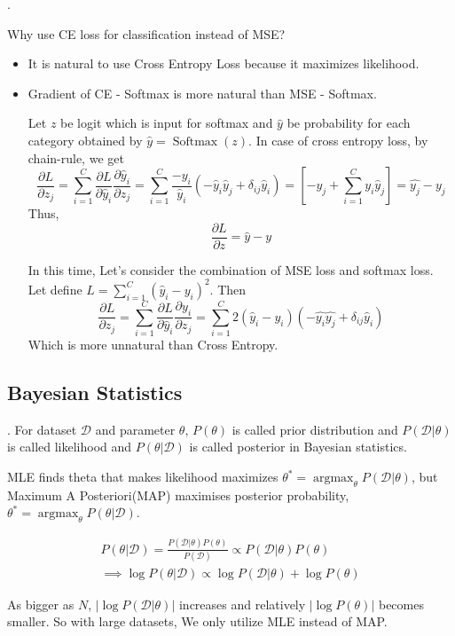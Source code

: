 \documentclass[8pt]{beamer}
\newcommand{\mc}[1]{\mathcal{#1}}
\newcommand{\abs}[1]{\left\lvert #1 \right\rvert}
\newcommand{\argmax}[1]{\operatorname{arg max}_{#1}}
\newcommand{\Softmax}[1]{\operatorname{Softmax}\!\left(#1\right)}
\begin{document}
\begin{frame}{.}
  \begin{block}{Why use CE loss for classification instead of MSE?}
    \begin{itemize}
      \item It is natural to use  Cross Entropy Loss because it maximizes likelihood.
      \item Gradient of CE - Softmax is more natural than MSE - Softmax.

      Let $z$ be logit which is input for softmax and $\hat{y}$ be probability for each category obtained by $\hat{y} = \Softmax{z}$. In case of cross entropy loss, by chain-rule, we get \[\frac{\partial L}{\partial z_j} = \sum_{i=1}^C \frac{\partial L}{\partial \hat{y}_i}\frac{\partial \hat{y}_i}{\partial z_j} = \sum_{i=1}^C \frac{-y_i}{\hat{y}_i} (-\hat{y}_i \hat{y}_j + \delta_{ij} \hat{y}_i) =  \left[-y_j + \sum_{i=1}^C y_i \hat{y}_j \right] = \hat{y_j} - y_j\]
      Thus,
      \[\frac{\partial L}{\partial z} = \hat{y} - y\]

      In this time, Let's consider the combination of MSE loss and softmax loss. Let define $L = \sum_{i=1}^C (\hat{y}_i - y_i)^2$. Then
      \[
        \frac{\partial L}{\partial z_j} = \sum_{i=1}^C \frac{\partial L}{\partial \hat{y}_i}\frac{\partial y_i}{\partial z_j} = \sum_{i=1}^C 2(\hat{y}_i - y_i)(-\hat{y_i}\hat{y_j} + \delta_{ij} \hat{y}_i)
      \]
      Which is more unnatural than Cross Entropy.
    \end{itemize}

  
  \end{block}
\end{frame}


\subsection{Bayesian Statistics}
\begin{frame}{.}
  For dataset $\mc{D}$ and parameter $\theta$, $P(\theta)$ is called prior distribution and $P(\mc{D}|\theta)$ is called likelihood and $P(\theta|\mc{D})$ is called posterior in Bayesian statistics.

  \bigskip
  MLE finds theta that makes likelihood maximizes $\theta^\ast = \argmax{\theta} P(\mc{D}|\theta)$, but Maximum A Posteriori(MAP) maximises posterior probability, $\theta^\ast = \argmax{\theta} P(\theta | \mc{D})$.

  \[
  \begin{gathered}
    P(\theta | \mc{D}) = \frac{P(\mc{D}|\theta)P(\theta)}{P(\mc{D})} \propto P(\mc{D}|\theta) P(\theta) \\
    \implies \log{P(\theta |\mc{D})} \propto \log{P(\mc{D}|\theta)} + \log{P(\theta)}
  \end{gathered}
  \]

  \bigskip
  As bigger as $N$, $\abs{\log{P(\mc{D}|\theta)}}$ increases and relatively $\abs{\log{P(\theta)}}$ becomes smaller. So with large datasets, We only utilize MLE instead of MAP.
\end{frame}
\end{document}
